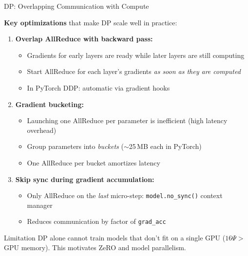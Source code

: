 \begin{frame}{DP: Overlapping Communication with Compute}

  \textbf{Key optimizations} that make DP scale well in practice:

  \vspace{0.5em}
  \begin{enumerate}
    \item \textbf{Overlap AllReduce with backward pass:}
      \begin{itemize}
        \item Gradients for early layers are ready while later layers are still computing
        \item Start AllReduce for each layer's gradients \emph{as soon as they are computed}
        \item In PyTorch DDP: automatic via gradient hooks
      \end{itemize}

    \vspace{0.3em}
    \item \textbf{Gradient bucketing:}
      \begin{itemize}
        \item Launching one AllReduce per parameter is inefficient (high latency overhead)
        \item Group parameters into \emph{buckets} ($\sim$25\,MB each in PyTorch)
        \item One AllReduce per bucket amortizes latency
      \end{itemize}

    \vspace{0.3em}
    \item \textbf{Skip sync during gradient accumulation:}
      \begin{itemize}
        \item Only AllReduce on the \emph{last} micro-step: \texttt{model.no\_sync()} context manager
        \item Reduces communication by factor of \texttt{grad\_acc}
      \end{itemize}
  \end{enumerate}

  \vspace{0.3em}
  \begin{alertblock}{Limitation}
    DP alone cannot train models that don't fit on a single GPU ($16\Psi > $ GPU memory).
    This motivates ZeRO and model parallelism.
  \end{alertblock}
\end{frame}
